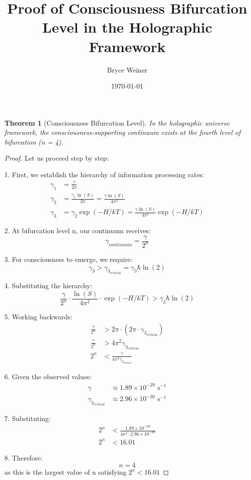 \documentclass{article}
\title{Proof of Consciousness Bifurcation Level in the Holographic Framework}
\author{Bryce Weiner}
\date{\today}
\newtheorem{theorem}{Theorem}
\begin{document}
\maketitle

\begin{theorem}[Consciousness Bifurcation Level]
In the holographic universe framework, the consciousness-supporting continuum exists at the fourth level of bifurcation (n = 4).
\end{theorem}

\begin{proof}
Let us proceed step by step:

1. First, we establish the hierarchy of information processing rates:
   \begin{align*}
   \gamma_1 &= \frac{\gamma}{2\pi} \\
   \gamma_2 &= \frac{\gamma_1\ln(S)}{2\pi} = \frac{\gamma\ln(S)}{4\pi^2} \\
   \gamma_3 &= \gamma_2\exp(-H/kT) = \frac{\gamma\ln(S)}{4\pi^2}\exp(-H/kT)
   \end{align*}

2. At bifurcation level n, our continuum receives:
   \begin{equation*}
   \gamma_{continuum} = \frac{\gamma}{2^n}
   \end{equation*}

3. For consciousness to emerge, we require:
   \begin{equation*}
   \gamma_3 > \gamma_{3_{critical}} = \gamma_3\hbar\ln(2)
   \end{equation*}

4. Substituting the hierarchy:
   \begin{equation*}
   \frac{\gamma}{2^n} \cdot \frac{\ln(S)}{4\pi^2} \cdot \exp(-H/kT) > \gamma_3\hbar\ln(2)
   \end{equation*}

5. Working backwards:
   \begin{align*}
   \frac{\gamma}{2^n} &> 2\pi \cdot (2\pi \cdot \gamma_{3_{critical}}) \\
   \frac{\gamma}{2^n} &> 4\pi^2\gamma_{3_{critical}} \\
   2^n &< \frac{\gamma}{4\pi^2\gamma_{3_{critical}}}
   \end{align*}

6. Given the observed values:
   \begin{align*}
   \gamma &\approx 1.89 \times 10^{-29} \text{ s}^{-1} \\
   \gamma_{3_{critical}} &\approx 2.96 \times 10^{-30} \text{ s}^{-1}
   \end{align*}

7. Substituting:
   \begin{align*}
   2^n &< \frac{1.89 \times 10^{-29}}{4\pi^2 \cdot 2.96 \times 10^{-30}} \\
   2^n &< 16.01
   \end{align*}

8. Therefore:
   \begin{equation*}
   n = 4
   \end{equation*}
   as this is the largest value of n satisfying $2^n < 16.01$

\end{proof}
\end{document}
